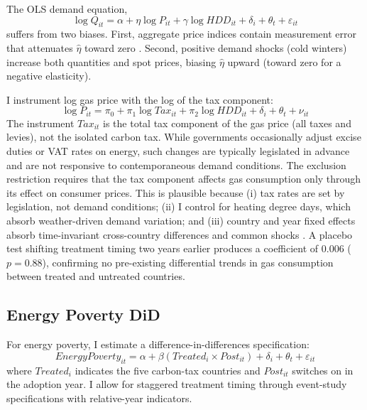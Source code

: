 \documentclass[12pt]{article}
\begin{document}
The OLS demand equation,
\begin{equation}
\log Q_{it} = \alpha + \eta \log P_{it} + \gamma \log HDD_{it} + \delta_i + \theta_t + \varepsilon_{it}
\label{eq:demand}
\end{equation}
suffers from two biases. First, aggregate price indices contain measurement error that attenuates $\hat{\eta}$ toward zero \citep{hausman2001mismeasured}. Second, positive demand shocks (cold winters) increase both quantities and spot prices, biasing $\hat{\eta}$ upward (toward zero for a negative elasticity).

I instrument log gas price with the log of the tax component:
\begin{equation}
\log P_{it} = \pi_0 + \pi_1 \log Tax_{it} + \pi_2 \log HDD_{it} + \delta_i + \theta_t + \nu_{it}
\label{eq:firststage}
\end{equation}
The instrument $Tax_{it}$ is the total tax component of the gas price (all taxes and levies), not the isolated carbon tax. While governments occasionally adjust excise duties or VAT rates on energy, such changes are typically legislated in advance and are not responsive to contemporaneous demand conditions. The exclusion restriction requires that the tax component affects gas consumption only through its effect on consumer prices. This is plausible because (i) tax rates are set by legislation, not demand conditions; (ii) I control for heating degree days, which absorb weather-driven demand variation; and (iii) country and year fixed effects absorb time-invariant cross-country differences and common shocks \citep{coglianese2017gasoline}. A placebo test shifting treatment timing two years earlier produces a coefficient of 0.006 ($p = 0.88$), confirming no pre-existing differential trends in gas consumption between treated and untreated countries.

\subsection{Energy Poverty DiD}

For energy poverty, I estimate a difference-in-differences specification:
\begin{equation}
EnergyPoverty_{it} = \alpha + \beta (Treated_i \times Post_{it}) + \delta_i + \theta_t + \varepsilon_{it}
\label{eq:epov}
\end{equation}
where $Treated_i$ indicates the five carbon-tax countries and $Post_{it}$ switches on in the adoption year. I allow for staggered treatment timing through event-study specifications with relative-year indicators.
\end{document}
